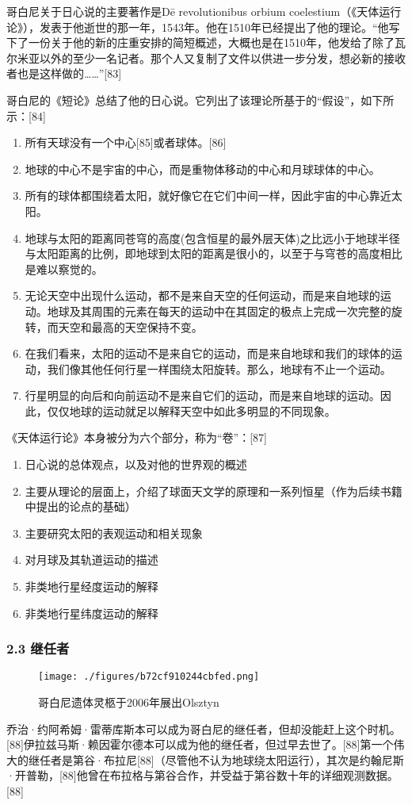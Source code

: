 哥白尼关于日心说的主要著作是Dē revolutionibus orbium coelestium（《天体运行论》），发表于他逝世的那一年，1543年。他在1510年已经提出了他的理论。“他写下了一份关于他的新的庄重安排的简短概述，大概也是在1510年，他发给了除了瓦尔米亚以外的至少一名记者。那个人又复制了文件以供进一步分发，想必新的接收者也是这样做的……”[83]

哥白尼的《短论》总结了他的日心说。它列出了该理论所基于的“假设”，如下所示：[84]
\begin{enumerate}
\item 所有天球没有一个中心[85]或者球体。[86]
\item 地球的中心不是宇宙的中心，而是重物体移动的中心和月球球体的中心。
\item 所有的球体都围绕着太阳，就好像它在它们中间一样，因此宇宙的中心靠近太阳。
\item 地球与太阳的距离同苍穹的高度(包含恒星的最外层天体)之比远小于地球半径与太阳距离的比例，即地球到太阳的距离是很小的，以至于与穹苍的高度相比是难以察觉的。
\item 无论天空中出现什么运动，都不是来自天空的任何运动，而是来自地球的运动。地球及其周围的元素在每天的运动中在其固定的极点上完成一次完整的旋转，而天空和最高的天空保持不变。
\item 在我们看来，太阳的运动不是来自它的运动，而是来自地球和我们的球体的运动，我们像其他任何行星一样围绕太阳旋转。那么，地球有不止一个运动。
\item 行星明显的向后和向前运动不是来自它们的运动，而是来自地球的运动。因此，仅仅地球的运动就足以解释天空中如此多明显的不同现象。
\end{enumerate}

《天体运行论》本身被分为六个部分，称为“卷”：[87]
\begin{enumerate}
\item 日心说的总体观点，以及对他的世界观的概述
\item 主要从理论的层面上，介绍了球面天文学的原理和一系列恒星（作为后续书籍中提出的论点的基础）
\item 主要研究太阳的表观运动和相关现象
\item 对月球及其轨道运动的描述
\item 非类地行星经度运动的解释
\item 非类地行星纬度运动的解释
\end{enumerate}

\subsubsection{2.3 继任者}
\begin{figure}[ht]
\centering
\texttt{[image: ./figures/b72cf910244cbfed.png]}
\caption{哥白尼遗体灵柩于2006年展出Olsztyn} \label{fig_GBN_23}
\end{figure}
乔治·约阿希姆·雷蒂库斯本可以成为哥白尼的继任者，但却没能赶上这个时机。[88]伊拉兹马斯·赖因霍尔德本可以成为他的继任者，但过早去世了。[88]第一个伟大的继任者是第谷·布拉尼[88]（尽管他不认为地球绕太阳运行），其次是约翰尼斯·开普勒，[88]他曾在布拉格与第谷合作，并受益于第谷数十年的详细观测数据。[88]

